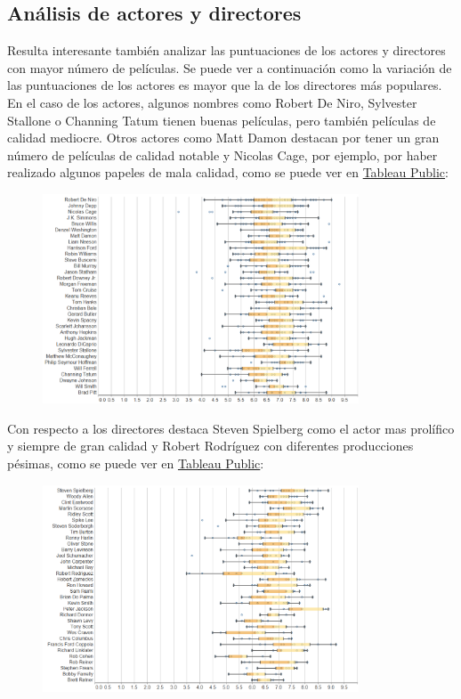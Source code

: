 \documentclass{article}
\begin{document}
\clearpage

\subsection{Análisis de actores y directores}

Resulta interesante también analizar las puntuaciones de los actores y directores con mayor número de películas. Se puede ver a continuación como la variación de las puntuaciones de los actores es mayor que la de los directores más populares. En el caso de los actores, algunos nombres como Robert De Niro, Sylvester Stallone o Channing Tatum tienen buenas películas, pero también películas de calidad mediocre. Otros actores como Matt Damon destacan por tener un gran número de películas de calidad notable y Nicolas Cage, por ejemplo, por haber realizado algunos papeles de mala calidad, como se puede ver en \href{https://public.tableau.com/profile/javier6580\#!/vizhome/proyecto_fin_de_master_dataset/rating_actors}{Tableau Public}:

\begin{figure}[h]
\centering
\includegraphics[width=3.7in,clip,keepaspectratio]{./images_latex/rating_actors}
\end{figure}

Con respecto a los directores destaca Steven Spielberg como el actor mas prolífico y siempre de gran calidad y Robert Rodríguez con diferentes producciones pésimas, como se puede ver en \href{https://public.tableau.com/profile/javier6580\#!/vizhome/proyecto_fin_de_master_dataset/rating_directors}{Tableau Public}:

\begin{figure}[h]
\centering
\includegraphics[width=3.7in,clip,keepaspectratio]{./images_latex/rating_directors}
\end{figure}
\end{document}

